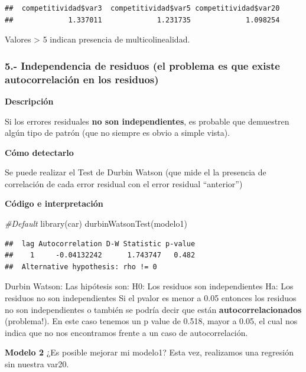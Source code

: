 \documentclass[
]{article}
\newenvironment{Shaded}{\begin{snugshade}}{\end{snugshade}}
\newcommand{\CommentTok}[1]{\textcolor[rgb]{0.56,0.35,0.01}{\textit{#1}}}
\newcommand{\FunctionTok}[1]{\textcolor[rgb]{0.00,0.00,0.00}{#1}}
\newcommand{\NormalTok}[1]{#1}
\begin{document}
\begin{verbatim}
##  competitividad$var3  competitividad$var5 competitividad$var20 
##             1.337011             1.231735             1.098254
\end{verbatim}

Valores \textgreater{} 5 indican presencia de multicolinealidad.

\hypertarget{independencia-de-residuos-el-problema-es-que-existe-autocorrelaciuxf3n-en-los-residuos}{%
\subsubsection{5.- Independencia de residuos (el problema es que existe
autocorrelación en los
residuos)}\label{independencia-de-residuos-el-problema-es-que-existe-autocorrelaciuxf3n-en-los-residuos}}

\textbf{Descripción}

Si los errores residuales \textbf{no son independientes}, es probable
que demuestren algún tipo de patrón (que no siempre es obvio a simple
vista).

\textbf{Cómo detectarlo}

Se puede realizar el Test de Durbin Watson (que mide el la presencia de
correlación de cada error residual con el error residual ``anterior'')

\textbf{Código e interpretación}

\begin{Shaded}
\begin{Highlighting}[]
\CommentTok{\#Default}
\FunctionTok{library}\NormalTok{(car)}
\FunctionTok{durbinWatsonTest}\NormalTok{(modelo1)}
\end{Highlighting}
\end{Shaded}

\begin{verbatim}
##  lag Autocorrelation D-W Statistic p-value
##    1     -0.04132242      1.743747   0.482
##  Alternative hypothesis: rho != 0
\end{verbatim}

Durbin Watson: Las hipótesis son: H0: Los residuos son independientes
Ha: Los residuos no son independientes Si el pvalor es menor a 0.05
entonces los residuos no son independientes o también se podría decir
que están \textbf{autocorrelacionados} (problema!). En este caso tenemos
un p value de 0.518, mayor a 0.05, el cual nos indica que no nos
encontramos frente a un caso de autocorrelación.

\textbf{Modelo 2} ¿Es posible mejorar mi modelo1? Esta vez, realizamos
una regresión sin nuestra var20.
\end{document}
